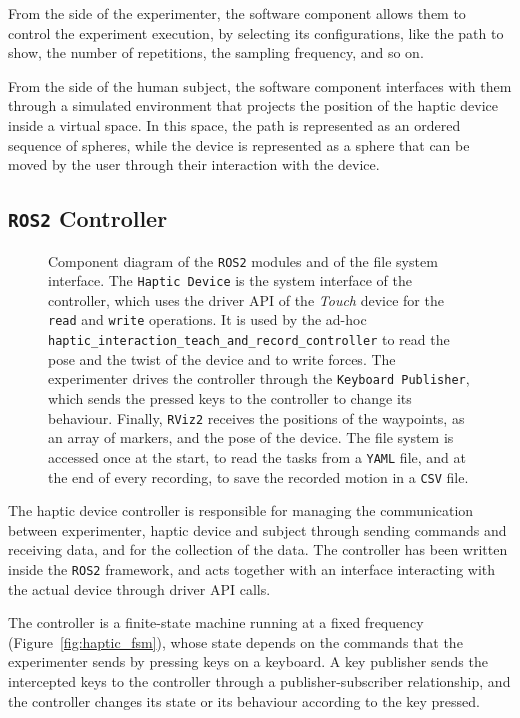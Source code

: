 \documentclass[12pt]{report}
\begin{document}
From the side of the experimenter, the software component allows them to control the experiment execution, by selecting its configurations, like the path to show, the number of repetitions, the sampling frequency, and so on.

From the side of the human subject, the software component interfaces with them through a simulated environment that projects the position of the haptic device inside a virtual space. In this space, the path is represented as an ordered sequence of spheres, while the device is represented as a sphere that can be moved by the user through their interaction with the device.

\subsection{\texttt{ROS2} Controller}
\begin{figure}[htbp]
    \centering
    
    \caption{Component diagram of the \texttt{ROS2} modules and of the file system interface. The \texttt{Haptic Device} is the system interface of the controller, which uses the driver API of the \textit{Touch} device for the \texttt{read} and \texttt{write} operations. It is used by the ad-hoc \texttt{haptic\_interaction\_teach\_and\_record\_controller} to read the pose and the twist of the device and to write forces. The experimenter drives the controller through the \texttt{Keyboard Publisher}, which sends the pressed keys to the controller to change its behaviour. Finally, \texttt{RViz2} receives the positions of the waypoints, as an array of markers, and the pose of the device. The file system is accessed once at the start, to read the tasks from a \texttt{YAML} file, and at the end of every recording, to save the recorded motion in a \texttt{CSV} file.}
    \label{fig:component_diagram}
\end{figure}
The haptic device controller is responsible for managing the communication between experimenter, haptic device and subject through sending commands and receiving data, and for the collection of the data. The controller has been written inside the \texttt{ROS2} framework, and acts together with an interface interacting with the actual device through driver API calls. 

The controller is a finite-state machine running at a fixed frequency (Figure~\ref{fig:haptic_fsm}), whose state depends on the commands that the experimenter sends by pressing keys on a keyboard. A key publisher sends the intercepted keys to the controller through a publisher-subscriber relationship, and the controller changes its state or its behaviour according to the key pressed.
\end{document}
